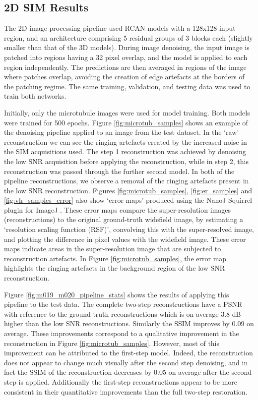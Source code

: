 \documentclass[12pt]{article}
\begin{document}
\subsection{2D SIM Results}

The 2D image processing pipeline used RCAN models with a 128x128 input region,
and an architecture comprising 5 residual groups of 3 blocks each (slightly smaller than that of the 3D models).
During image denoising, the input image is patched into regions having a 32 pixel overlap,
and the model is applied to each region independently.
The predictions are then averaged in regions of the image where patches overlap,
avoiding the creation of edge artefacts at the borders of the patching regime.
The same training, validation, and testing data was used to train both networks.

Initially, only the microtubule images were used for model training.
Both models were trained for 500 epochs.
Figure \ref{fig:microtub_samples} shows an example of the denoising pipeline applied to an image from the test dataset.
In the `raw' reconstruction we can see the ringing artefacts created by the increased noise in the SIM acquisitions used.
The step 1 reconstruction was achieved by denoising the low SNR acquisition before applying the reconstruction,
while in step 2, this reconstruction was passed through the further second model.
In both of the pipeline reconstructions, we observe a removal of the ringing artefacts present in the low SNR reconstruction.
Figures \ref{fig:microtub_samples}, \ref{fig:er_samples} and \ref{fig:vh_samples_error} also show `error maps' produced using the NanoJ-Squirrel plugin for ImageJ \cite{squirrel}.
These error maps compare the super-resolution images (reconstructions) to the original ground-truth widefield image,
by estimating a `resolution scaling function (RSF)', convolving this with the super-resolved image,
and plotting the difference in pixel values with the widefield image.
These error maps indicate areas in the super-resolution image that are subjected to reconstruction artefacts.
In Figure \ref{fig:microtub_samples}, the error map highlights the ringing artefacts in the background region of the low SNR reconstruction.

Figure \ref{fig:m019_m020_pipeline_stats} shows the results of applying this pipeline to the test data.
The complete two-step reconstructions have a PSNR with reference to the ground-truth reconstructions which is on average 3.8 dB higher than the low SNR reconstructions.
Similarly the SSIM improves by 0.09 on average.
These improvements correspond to a qualitative improvement in the reconstruction in Figure \ref{fig:microtub_samples}.
However, most of this improvement can be attributed to the first-step model.
Indeed, the reconstruction does not appear to change much visually after the second step denoising,
and in fact the SSIM of the reconstruction decreases by 0.05 on average after the second step is applied.
Additionally the first-step reconstructions appear to be more consistent in their quantitative improvements than the full two-step restoration.
\end{document}
